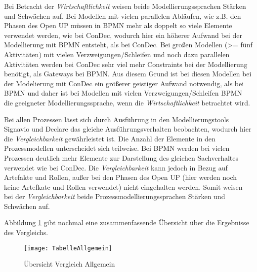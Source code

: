 Bei Betracht der \textit{Wirtschaftlichkeit} weisen beide Modellierungssprachen Stärken und Schwächen auf. Bei Modellen mit vielen parallelen Abläufen, wie z.B. den Phasen des Open UP müssen in BPMN mehr als doppelt so viele Elemente verwendet werden, wie bei ConDec, wodurch hier ein höherer Aufwand bei der Modellierung mit BPMN entsteht, als bei ConDec.\newline
Bei großen Modellen (>= fünf Aktivitäten) mit vielen Verzweigungen/Schleifen und noch dazu parallelen Aktivitäten werden bei ConDec sehr viel mehr Constraints bei der Modellierung benötigt, als Gateways bei BPMN. Aus diesem Grund ist bei diesen Modellen bei der Modelierung mit ConDec ein größerer geistiger Aufwand notwendig, als bei BPMN und daher ist bei Modellen mit vielen Verzweigungen/Schleifen BPMN die geeigneter Modellierungssprache, wenn die \textit{Wirtschaftlichkeit} betrachtet wird.\newline

Bei allen Prozessen lässt sich durch Ausführung in den Modellierungstools Signavio und Declare das gleiche Ausführungsverhalten beobachten, wodurch hier die \textit{Vergleichbarkeit} gewährleistet ist. \newline
Die Anzahl der Elemente in den Prozessmodellen unterscheidet sich teilweise. Bei BPMN werden bei vielen Prozessen deutlich mehr Elemente zur Darstellung des gleichen Sachverhaltes verwendet wie bei ConDec.\newline
Die \textit{Vergleichbarkeit} kann jedoch in Bezug auf Artefakte und Rollen, außer bei den Phasen des Open UP (hier werden noch keine Artefkate und Rollen verwendet) nicht eingehalten werden.\newline
Somit weisen bei der \textit{Vergleichbarkeit} beide Prozessmodellierungssprachen Stärken und Schwächen auf. \newline

Abbildung \ref{fig:TabelleAllgemein} gibt nochmal eine zusammenfassende Übersicht über die Ergebnisse des Vergleichs. 



 \begin{figure}[!htbp]
\begin{center}
  \texttt{[image: TabelleAllgemein]} %
  \caption{Übersicht Vergleich Allgemein}
  \label{fig:TabelleAllgemein}
\end{center}
\end{figure}





